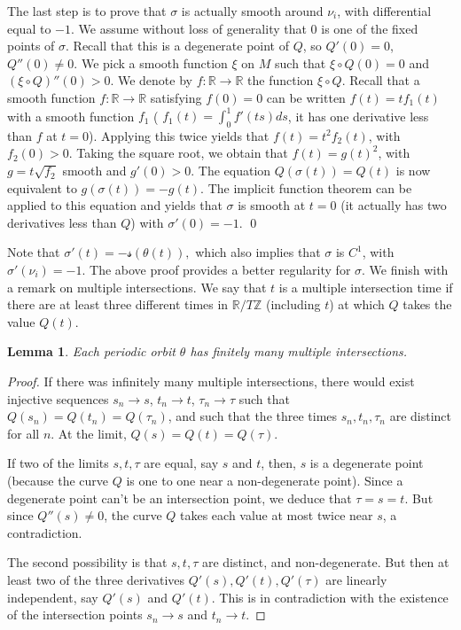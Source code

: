 \documentclass[10pt]{amsart}
\newcommand{\Rm}{\mathbb{R}}
\newcommand{\Zm}{\ensuremath{\mathbb{Z}}}
\newcommand{\ms}{\ensuremath{\mathscr{s}}}
\theoremstyle{plain}
\newtheorem{lem}{Lemma}
\theoremstyle{definition}
\begin{document}
The last step is to prove that $\sigma$ is actually smooth around $\nu_i$, with differential equal to $-1$. We assume without loss of generality that $0$ is one of the fixed points of $\sigma$. Recall that this is a degenerate point of $Q$, so $Q'(0)=0$, $Q''(0)\neq 0$. We pick a smooth function $\xi$ on $M$ such that $\xi\circ Q(0)=0$ and $(\xi\circ Q)''(0)>0$. We denote by $f:\Rm\to \Rm $ the function $\xi\circ Q$.
Recall that a smooth function $f:\Rm\to \Rm$ satisfying $f(0)=0$ can be written $f(t)=tf_1(t)$ with a smooth function $f_1$ (
$f_1(t)=\int_0^1 f'(ts)ds$, it has one derivative less than $f$ at $t=0$). Applying this twice yields that $f(t)=t^2 f_2(t)$, with $f_2(0)> 0$. Taking the square root, we obtain that $f(t)=g(t)^2$, with $g=t\sqrt{f_2}$ smooth and $g'(0)>0$.
The equation $Q(\sigma(t))=Q(t)$ is now equivalent to $g (\sigma(t))=-g(t)$. The implicit function theorem can be applied to this equation and yields that $\sigma$ is smooth at $t=0$ (it actually has two derivatives less than $Q$) with $\sigma'(0)=-1$.
\qed

\medskip
Note that
$
\sigma'(t)=-\ms(\theta(t)),
$
which also implies that $\sigma$ is $C^1$, with $\sigma'(\nu_i)=-1$. The above proof provides a better regularity for $\sigma$.
We finish with a remark on multiple intersections. We say that $t$ is a multiple intersection time if there are at least three different times in $\Rm/T\Zm$ (including $t$) at which $Q$ takes the value $Q(t)$.

\begin{lem}\label{lem-multi}
Each periodic orbit $\theta$ has finitely many multiple intersections.
\end{lem}

\begin{proof}
If there was infinitely many multiple intersections, there would exist injective sequences $s_n\to s$, $t_n\to t$, $\tau_n \to \tau$
such that $Q(s_n)=Q(t_n)=Q(\tau_n)$, and such that the three times $s_n,t_n,\tau_n$ are distinct for all $n$.
At the limit, $Q(s)=Q(t)=Q(\tau)$.

If two of the limits $s,t,\tau$ are equal, say $s$ and $t$, then, $s$ is a degenerate point (because the curve $Q$ is one to one
near a non-degenerate point). Since a degenerate point can't be an intersection point, we deduce that $\tau=s=t$.
But since $Q''(s)\neq 0$, the curve $Q$ takes each value at most twice near $s$, a contradiction.

The second possibility is that $s, t, \tau$ are distinct, and non-degenerate. But then at least two of the three derivatives
$Q'(s), Q'(t), Q'(\tau)$ are linearly independent, say $Q'(s)$ and $Q'(t)$. This is in contradiction with the existence of the intersection points $s_n\to s$ and $t_n\to t$.
\end{proof}
\end{document}
